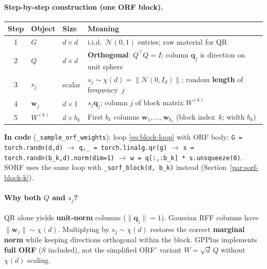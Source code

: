 \documentclass[11pt]{article}
\begin{document}
\paragraph{Step-by-step construction (one ORF block).}
\begin{center}
\renewcommand{\arraystretch}{1.35}
\begin{tabular}{@{}clll@{}}
\toprule
\textbf{Step} & \textbf{Object} & \textbf{Size} & \textbf{Meaning} \\
\midrule
1 & $G$ & $d\times d$ & i.i.d.\ $\mathcal N(0,1)$ entries; raw material for QR \\
2 & $Q$ & $d\times d$ & \textbf{Orthogonal}: $Q^{\top}Q=I$; column $\mathbf q_j$ is direction on unit sphere \\
3 & $s_j$ & scalar & $s_j\sim\chi(d)=\|\mathcal N(0,I_d)\|$; random \textbf{length} of frequency~$j$ \\
4 & $\mathbf w_j$ & $d\times 1$ & $s_j\mathbf q_j$; column $j$ of block matrix $W^{(k)}$ \\
5 & $W^{(k)}$ & $d\times b_k$ & First $b_k$ columns $\mathbf w_1,\ldots,\mathbf w_{b_k}$ (block index~$k$; width $b_k$) \\
\bottomrule
\end{tabular}
\end{center}
\textbf{In code} (\texttt{\_sample\_orf\_weights}): loop \eqref{eq:block-loop} with ORF body:
\texttt{G = torch.randn(d,d)} $\to$ \texttt{q,\_ = torch.linalg.qr(g)} $\to$
\texttt{s = torch.randn(b\_k,d).norm(dim=1)} $\to$ \texttt{w = q[:,:b\_k] * s.unsqueeze(0)}.
SORF uses the same loop with \texttt{\_sorf\_block(d, b\_k)} instead (Section~\ref{par:sorf-block-k}).

\paragraph{Why both $Q$ and $s_j$?}
QR alone yields \textbf{unit-norm} columns ($\|\mathbf q_j\|=1$).
Gaussian RFF columns have $\|\mathbf w_j\|\sim\chi(d)$.
Multiplying by $s_j\sim\chi(d)$ restores the correct \textbf{marginal norm} while keeping directions orthogonal within the block.
GPPlus implements \textbf{full ORF} ($S$ included), not the simplified ORF$'$ variant $W=\sqrt{d}\,Q$ without $\chi(d)$ scaling.
\end{document}
